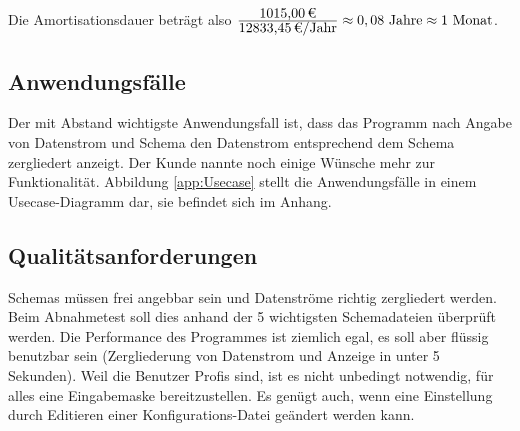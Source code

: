 Die Amortisationsdauer beträgt also $\frac{\eur{1015,00}}{\eur{12833,45}\mbox{/Jahr}} \approx 0,08 \mbox{ Jahre} \approx 1 \mbox{ Monat}$.


\subsection{Anwendungsfälle}
\label{sec:Anwendungsfaelle}
Der mit Abstand wichtigste Anwendungsfall ist, dass das Programm nach Angabe von Datenstrom und Schema den Datenstrom entsprechend dem Schema zergliedert anzeigt.
Der Kunde nannte noch einige Wünsche mehr zur Funktionalität. Abbildung \ref{app:Usecase} stellt die Anwendungsfälle in einem Usecase-Diagramm dar, sie befindet sich im Anhang.


\subsection{Qualitätsanforderungen}
\label{sec:Qualitaetsanforderungen}
Schemas müssen frei angebbar sein und Datenströme richtig zergliedert werden.
Beim Abnahmetest soll dies anhand der 5 wichtigsten Schemadateien überprüft werden.
Die Performance des Programmes ist ziemlich egal, es soll aber flüssig benutzbar sein (Zergliederung von Datenstrom und Anzeige in unter 5 Sekunden).
Weil die Benutzer Profis sind, ist es nicht unbedingt notwendig, für alles eine Eingabemaske bereitzustellen. Es genügt auch, wenn eine Einstellung durch Editieren einer Konfigurations-Datei geändert werden kann.



